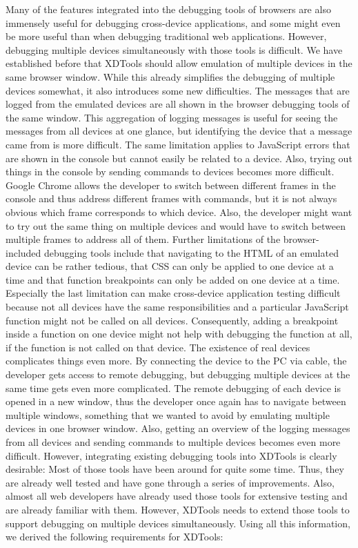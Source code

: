 Many of the features integrated into the debugging tools of browsers are also immensely useful for debugging cross-device applications, and some might even be more useful than when debugging traditional web applications. However, debugging multiple devices simultaneously with those tools is difficult. We have established before that XDTools should allow emulation of multiple devices in the same browser window. While this already simplifies the debugging of multiple devices somewhat, it also introduces some new difficulties. The messages that are logged from the emulated devices are all shown in the browser debugging tools of the same window. This aggregation of logging messages is useful for seeing the messages from all devices at one glance, but identifying the device that a message came from is more difficult. The same limitation applies to JavaScript errors that are shown in the console but cannot easily be related to a device. Also, trying out things in the console by sending commands to devices becomes more difficult. Google Chrome allows the developer to switch between different frames in the console and thus address different frames with commands, but it is not always obvious which frame corresponds to which device. Also, the developer might want to try out the same thing on multiple devices and would have to switch between multiple frames to address all of them. Further limitations of the browser-included debugging tools include that navigating to the HTML of an emulated device can be rather tedious, that CSS can only be applied to one device at a time and that function breakpoints can only be added on one device at a time. Especially the last limitation can make cross-device application testing difficult because not all devices have the same responsibilities and a particular JavaScript function might not be called on all devices. Consequently, adding a breakpoint inside a function on one device might not help with debugging the function at all, if the function is not called on that device. The existence of real devices complicates things even more. By connecting the device to the PC via cable, the developer gets access to remote debugging, but debugging multiple devices at the same time gets even more complicated. The remote debugging of each device is opened in a new window, thus the developer once again has to navigate between multiple windows, something that we wanted to avoid by emulating multiple devices in one browser window. Also, getting an overview of the logging messages from all devices and sending commands to multiple devices becomes even more difficult. However, integrating existing debugging tools into XDTools is clearly desirable: Most of those tools have been around for quite some time. Thus, they are already well tested and have gone through a series of improvements. Also, almost all web developers have already used those tools for extensive testing and are already familiar with them. However, XDTools needs to extend those tools to support debugging on multiple devices simultaneously. Using all this information, we derived the following requirements for XDTools:
